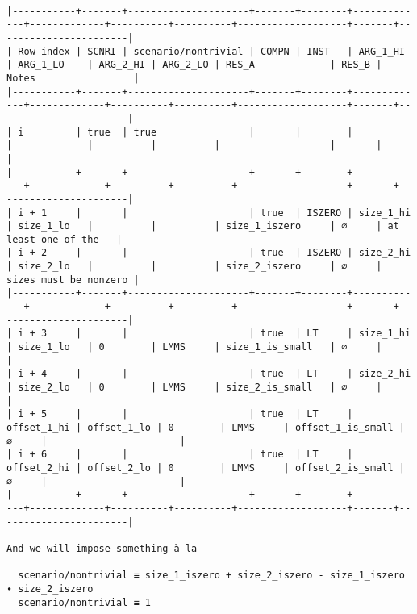 \documentclass[varwidth=\maxdimen,margin=0.5cm,multi={verbatim}]{standalone}
\begin{document}
\begin{verbatim}

|-----------+-------+---------------------+-------+--------+-------------+-------------+----------+----------+-------------------+-------+-----------------------|
| Row index | SCNRI | scenario/nontrivial | COMPN | INST   | ARG_1_HI    | ARG_1_LO    | ARG_2_HI | ARG_2_LO | RES_A             | RES_B | Notes                 |
|-----------+-------+---------------------+-------+--------+-------------+-------------+----------+----------+-------------------+-------+-----------------------|
| i         | true  | true                |       |        |             |             |          |          |                   |       |                       |
|-----------+-------+---------------------+-------+--------+-------------+-------------+----------+----------+-------------------+-------+-----------------------|
| i + 1     |       |                     | true  | ISZERO | size_1_hi   | size_1_lo   |          |          | size_1_iszero     | ∅     | at least one of the   |
| i + 2     |       |                     | true  | ISZERO | size_2_hi   | size_2_lo   |          |          | size_2_iszero     | ∅     | sizes must be nonzero |
|-----------+-------+---------------------+-------+--------+-------------+-------------+----------+----------+-------------------+-------+-----------------------|
| i + 3     |       |                     | true  | LT     | size_1_hi   | size_1_lo   | 0        | LMMS     | size_1_is_small   | ∅     |                       |
| i + 4     |       |                     | true  | LT     | size_2_hi   | size_2_lo   | 0        | LMMS     | size_2_is_small   | ∅     |                       |
| i + 5     |       |                     | true  | LT     | offset_1_hi | offset_1_lo | 0        | LMMS     | offset_1_is_small | ∅     |                       |           
| i + 6     |       |                     | true  | LT     | offset_2_hi | offset_2_lo | 0        | LMMS     | offset_2_is_small | ∅     |                       |           
|-----------+-------+---------------------+-------+--------+-------------+-------------+----------+----------+-------------------+-------+-----------------------|

And we will impose something à la

  scenario/nontrivial ≡ size_1_iszero + size_2_iszero - size_1_iszero ∙ size_2_iszero
  scenario/nontrivial ≡ 1

\end{verbatim}
\end{document}
